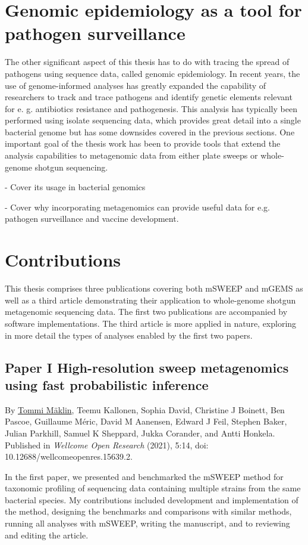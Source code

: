 \documentclass[officiallayout]{tktla}
\begin{document}
\section{Genomic epidemiology as a tool for pathogen surveillance}
The other significant aspect of this thesis has to do with tracing the
spread of pathogens using sequence data, called genomic
epidemiology. In recent years, the use of genome-informed analyses has
greatly expanded the capability of researchers to track and trace
pathogens and identify genetic elements relevant for e. g. antibiotics
resistance and pathogenesis. This analysis has typically been
performed using isolate sequencing data, which provides great detail
into a single bacterial genome but has some downsides covered in the
previous sections. One important goal of the thesis work has been to
provide tools that extend the analysis capabilities to metagenomic
data from either plate sweeps or whole-genome shotgun sequencing.

- Cover its usage in bacterial genomics

- Cover why incorporating metagenomics can provide useful data for e.g. pathogen surveillance and vaccine development.

\section{Contributions}

This thesis comprises three publications covering both mSWEEP and
mGEMS as well as a third article demonstrating their application to
whole-genome shotgun metagenomic sequencing data. The first two
publications are accompanied by software implementations. The third
article is more applied in nature, exploring in more detail the types
of analyses enabled by the first two papers.

\subsection*{Paper I \textemdash High-resolution sweep metagenomics using fast probabilistic inference}
By \underline{Tommi Mäklin}, Teemu Kallonen, Sophia David, Christine J
Boinett, Ben Pascoe, Guillaume Méric, David M Aanensen, Edward J Feil,
Stephen Baker, Julian Parkhill, Samuel K Sheppard, Jukka Corander, and
Antti Honkela. Published in \textit{Wellcome Open Research} (2021),
5:14, doi: 10.12688/wellcomeopenres.15639.2.

In the first paper, we presented and benchmarked the mSWEEP method for
taxonomic profiling of sequencing data containing multiple strains
from the same bacterial species. My contributions included development
and implementation of the method, designing the benchmarks and
comparisons with similar methods, running all analyses with mSWEEP,
writing the manuscript, and to reviewing and editing the article.
\end{document}
